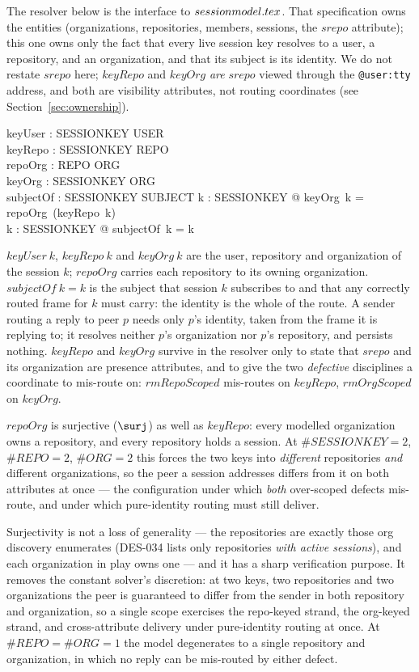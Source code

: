 \documentclass[a4paper,10pt,fleqn]{article}
\begin{document}
The resolver below is the interface to $session\-model.tex$.  That
specification owns the entities (organizations, repositories, members,
sessions, the $srepo$ attribute); this one owns only the fact that every
live session key resolves to a user, a repository, and an organization,
and that its subject is its identity.  We do not restate $srepo$ here;
$keyRepo$ and $keyOrg$ \emph{are} $srepo$ viewed through the
\texttt{@user:tty} address, and both are visibility attributes, not
routing coordinates (see Section~\ref{sec:ownership}).

\begin{axdef}
  keyUser : SESSIONKEY \fun USER \\
  keyRepo : SESSIONKEY \surj REPO \\
  repoOrg : REPO \surj ORG \\
  keyOrg : SESSIONKEY \fun ORG \\
  subjectOf : SESSIONKEY \fun SUBJECT
\where
  \forall k : SESSIONKEY @ keyOrg~k = repoOrg~(keyRepo~k) \\
  \forall k : SESSIONKEY @ subjectOf~k = k
\end{axdef}

$keyUser~k$, $keyRepo~k$ and $keyOrg~k$ are the user, repository and
organization of the session $k$; $repoOrg$ carries each repository to its
owning organization.  $subjectOf~k = k$ is the subject that session $k$
subscribes to and that any correctly routed frame for $k$ must carry: the
identity is the whole of the route.  A sender routing a reply to peer $p$
needs only $p$'s identity, taken from the frame it is replying to; it
resolves neither $p$'s organization nor $p$'s repository, and persists
nothing.  $keyRepo$ and $keyOrg$ survive in the resolver only to state
that $srepo$ and its organization are presence attributes, and to give
the two \emph{defective} disciplines a coordinate to mis-route on:
$rmRepoScoped$ mis-routes on $keyRepo$, $rmOrgScoped$ on $keyOrg$.

$repoOrg$ is surjective ($\surj$) as well as $keyRepo$: every modelled
organization owns a repository, and every repository holds a session.  At
$\#SESSIONKEY = 2$, $\#REPO = 2$, $\#ORG = 2$ this forces the two keys
into \emph{different} repositories \emph{and} different organizations, so
the peer a session addresses differs from it on both attributes at once
--- the configuration under which \emph{both} over-scoped defects
mis-route, and under which pure-identity routing must still deliver.

Surjectivity is not a loss of generality --- the repositories are
exactly those org discovery enumerates (DES-034 lists only repositories
\emph{with active sessions}), and each organization in play owns one ---
and it has a sharp verification purpose.  It removes the constant
solver's discretion: at two keys, two repositories and two
organizations the peer is guaranteed to differ from the sender in both
repository and organization, so a single scope exercises the repo-keyed
strand, the org-keyed strand, and cross-attribute delivery under
pure-identity routing at once.  At $\#REPO = \#ORG = 1$ the model
degenerates to a single repository and organization, in which no reply
can be mis-routed by either defect.
\end{document}
